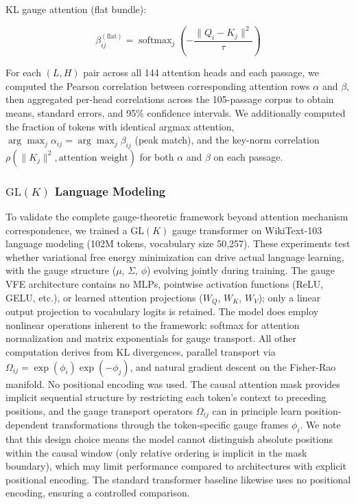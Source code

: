 \documentclass[twoside,11pt]{article}
\begin{document}
KL gauge attention (flat bundle):

\begin{equation}
\beta^{(\mathrm{flat})}_{ij} = \operatorname{softmax}_j\!\left( -\frac{\|Q_i - K_j\|^2}{\tau} \right)
\end{equation}

For each $(L,H)$ pair across all 144 attention heads and each passage, we computed the Pearson correlation between corresponding attention rows $\alpha$ and $\beta$, then aggregated per-head correlations across the 105-passage corpus to obtain means, standard errors, and 95\% confidence intervals. We additionally computed the fraction of tokens with identical argmax attention, $\arg\max_j \alpha_{ij} = \arg\max_j \beta_{ij}$ (peak match), and the key-norm correlation $\rho(\|K_j\|^2, \text{attention weight})$ for both $\alpha$ and $\beta$ on each passage.

\subsubsection{$\mathrm{GL}(K)$ Language Modeling}
\label{sec:experimental_design_glk}

To validate the complete gauge-theoretic framework beyond attention mechanism correspondence, we trained a $\mathrm{GL}(K)$ gauge transformer on WikiText-103 language modeling (102M tokens, vocabulary size 50,257). These experiments test whether variational free energy minimization can drive actual language learning, with the gauge structure ($\mu$, $\Sigma$, $\phi$) evolving jointly during training. The gauge VFE architecture contains no MLPs, pointwise activation functions (ReLU, GELU, etc.), or learned attention projections ($W_Q$, $W_K$, $W_V$); only a linear output projection to vocabulary logits is retained. The model does employ nonlinear operations inherent to the framework: softmax for attention normalization and matrix exponentials for gauge transport. All other computation derives from KL divergences, parallel transport via $\Omega_{ij} = \exp(\phi_i) \exp(-\phi_j)$, and natural gradient descent on the Fisher-Rao manifold. No positional encoding was used. The causal attention mask provides implicit sequential structure by restricting each token's context to preceding positions, and the gauge transport operators $\Omega_{ij}$ can in principle learn position-dependent transformations through the token-specific gauge frames $\phi_i$. We note that this design choice means the model cannot distinguish absolute positions within the causal window (only relative ordering is implicit in the mask boundary), which may limit performance compared to architectures with explicit positional encoding. The standard transformer baseline likewise uses no positional encoding, ensuring a controlled comparison.
\end{document}
